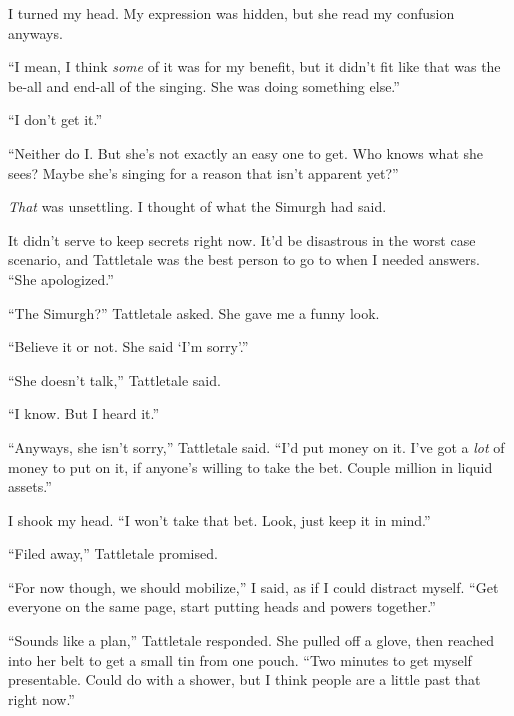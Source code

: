 I turned my head.  My expression was hidden, but she read my confusion anyways.



``I mean, I think \emph{some }of it was for my benefit, but it didn't fit like that was the be-all and end-all of the singing.  She was doing something else.''



``I don't get it.''



``Neither do I.  But she's not exactly an easy one to get.  Who knows what she sees?  Maybe she's singing for a reason that isn't apparent yet?''



\emph{That} was unsettling.  I thought of what the Simurgh had said.



It didn't serve to keep secrets right now.  It'd be disastrous in the worst case scenario, and Tattletale was the best person to go to when I needed answers.  ``She apologized.''



``The Simurgh?'' Tattletale asked.  She gave me a funny look.



``Believe it or not.  She said `I'm sorry'.''



``She doesn't talk,'' Tattletale said.



``I know.  But I heard it.''



``Anyways, she isn't sorry,'' Tattletale said.  ``I'd put money on it.  I've got a \emph{lot} of money to put on it, if anyone's willing to take the bet.  Couple million in liquid assets.''



I shook my head.  ``I won't take that bet.  Look, just keep it in mind.''



``Filed away,'' Tattletale promised.



``For now though, we should mobilize,'' I said, as if I could distract myself.  ``Get everyone on the same page, start putting heads and powers together.''



``Sounds like a plan,'' Tattletale responded.  She pulled off a glove, then reached into her belt to get a small tin from one pouch.  ``Two minutes to get myself presentable.  Could do with a shower, but I think people are a little past that right now.''



